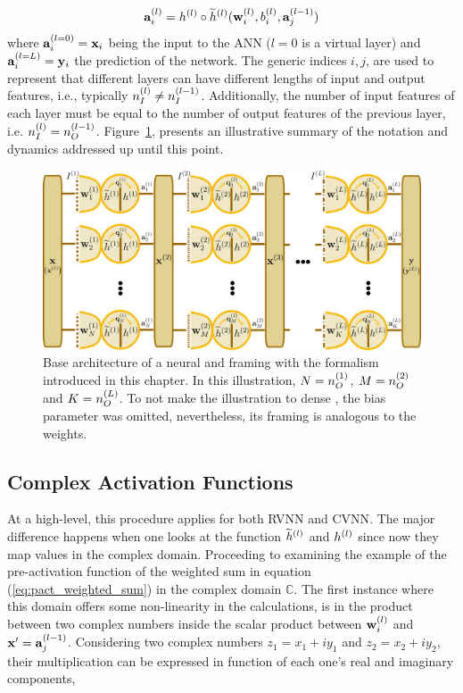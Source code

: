 \begin{equation}
	\mathbf{a}^{(l)}_{i} = h^{(l)} \circ \widetilde{h}^{(l)} (\mathbf{w}^{(l)}_{i}, b^{(l)}_{i}, \mathbf{a}^{(l-1)}_{j})
\end{equation}
where $ \mathbf{a}^{(l=0)}_{i} = \mathbf{x}_i $ being the input to the \gls{ANN} ($ l = 0 $ is a virtual layer) and $ \mathbf{a}^{(l=L)}_{i} = \mathbf{y}_i $ the prediction of the network. The generic indices $ i, j $, are used to represent that different layers can have different lengths of input and output features, i.e., typically $ n^{(l)}_{I} \neq n^{(l-1)}_{I} $. Additionally, the number of input features of each layer must be equal to the number of output features of the previous layer, i.e. $ n^{(l)}_{I} = n^{(l-1)}_{O} $. Figure~\ref{fig:complete_net}, presents an illustrative summary of the notation and dynamics addressed up until this point.

\begin{figure}[htbp]
	\centering
	\includegraphics[width=1.0\textwidth]{ch3/assets/complete_net.png}
	\caption{Base architecture of a neural and framing with the formalism introduced in this chapter. In this illustration, $  N = n^{(1)}_{O} $, $ M = n^{(2)}_{O}$ and $ K = n^{(L)}_{O} $. To not make the illustration to dense , the bias parameter was omitted, nevertheless, its framing is analogous to the weights.}
	\label{fig:complete_net}
\end{figure}

\subsection{Complex Activation Functions}
At a high-level, this procedure applies for both \gls{RVNN} and \gls{CVNN}. The major difference happens when one looks at the function $ \widetilde{h}^{(l)} $ and $ h^{(l)} $ since now they map values in the complex domain. Proceeding to examining the example of the pre-activation function of the weighted sum in equation (\ref{eq:pact_weighted_sum}) in the complex domain $ \mathbb{C} $. The first instance where this domain offers some non-linearity in the calculations, is in the product between two complex numbers inside the scalar product between $ \mathbf{w}^{(l)}_{i} $ and $ \mathbf{x}' = \mathbf{a}^{(l-1)}_{j} $.  Considering two complex numbers $ z_1 = x_1 + iy_1 $ and $ z_2 = x_2 + iy_2 $, their multiplication can be expressed in function of each one's real and imaginary components,

